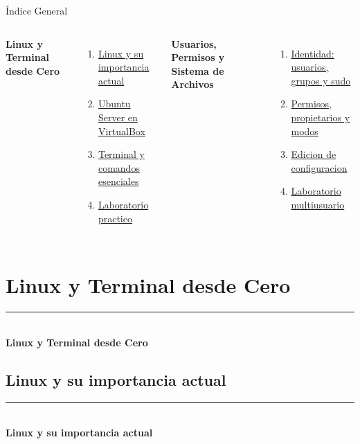 \documentclass[aspectratio=169]{beamer}
\newcommand{\MainHeaderSlide}[2]{%
  \begin{frame}[plain]
    \hypertarget{#2}{}
    \vspace*{0.25\textheight}
    {\color{black}\rule{0.28\textwidth}{1.2pt}}\\[0.5em]
    {\usebeamerfont{title}\fontsize{34}{40}\selectfont\bfseries #1}
  \end{frame}
}
\begin{document}
\begin{frame}{\'Indice General}
  \small
  \begin{columns}[t]
    \textbf{Linux y Terminal desde Cero}
    \begin{enumerate}
      \item \hyperlink{idx-linux-importancia}{Linux y su importancia actual}
      \item \hyperlink{idx-ubuntu-virtualbox}{Ubuntu Server en VirtualBox}
      \item \hyperlink{idx-terminal-comandos}{Terminal y comandos esenciales}
      \item \hyperlink{idx-laboratorio-practico}{Laboratorio practico}
    \end{enumerate}
    \textbf{Usuarios, Permisos y Sistema de Archivos}
    \begin{enumerate}
      \item \hyperlink{idx-identidad-linux}{Identidad: usuarios, grupos y sudo}
      \item \hyperlink{idx-permisos-linux}{Permisos, propietarios y modos}
      \item \hyperlink{idx-editores-config}{Edicion de configuracion}
      \item \hyperlink{idx-lab-multiusuario}{Laboratorio multiusuario}
    \end{enumerate}
  \end{columns}
\end{frame}

\section{Linux y Terminal desde Cero}
\MainHeaderSlide{Linux y Terminal desde Cero}{idx-semana-1}

\subsection{Linux y su importancia actual}
\MainHeaderSlide{Linux y su importancia actual}{idx-linux-importancia}
\end{document}
